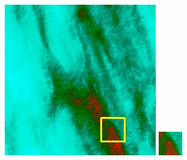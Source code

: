 \documentclass[10pt,UTF8,fntef]{ctexart}
\begin{document}
\begin{figure}[H]
{{\begin{minipage}[b]{0.15\linewidth}
            \includegraphics[width=1\linewidth]{../log/spoon3/cut/LC81321192014054LGN00_03249_spectral.jpg}\vspace{4pt}
            \includegraphics[width=1\linewidth]{../log/spoon3/cut/tmp_cut_LC81321192014054LGN00_03249_spectral.jpg}\vspace{4pt}

\end{minipage}}}
\end{figure}
\end{document}
